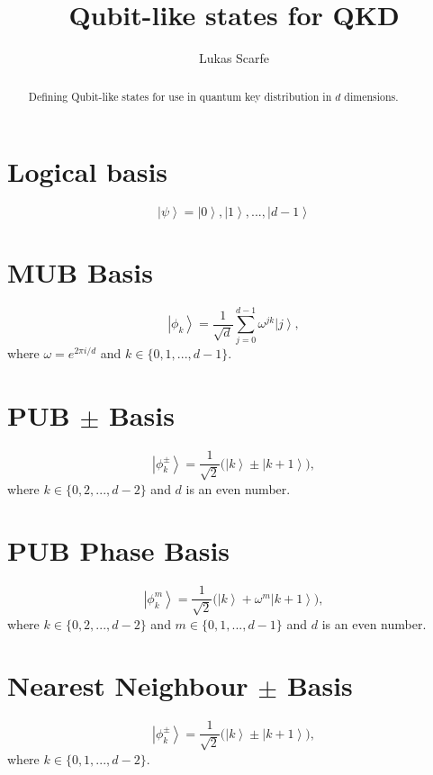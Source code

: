 \documentclass[]{article}
\title{Qubit-like states for QKD}
\author{Lukas Scarfe}
\newcommand{\ket}[1]{\left| #1 \right\rangle}
\begin{document}
\maketitle

\begin{abstract}
Defining Qubit-like states for use in quantum key distribution in $d$ dimensions.
\end{abstract}

\section{Logical basis}
\begin{equation}
\ket{\psi} = \ket{0}, \ket{1}, ... , \ket{d-1}
\end{equation}

\section{MUB Basis}
\begin{equation}
\ket{\phi_k} = \frac{1}{\sqrt{d}}\sum_{j=0}^{d-1} \omega^{jk} \ket{j},
\end{equation}
where $\omega = e^{2\pi i/d}$ and $k\in\{0,1,...,d-1\}$.

\section{PUB $\pm$ Basis}
\begin{equation}
\ket{\phi_k^{\pm}} = \frac{1}{\sqrt{2}}\big( \ket{k} \pm \ket{k+1} \big),
\end{equation}
where $k\in\{0,2,...,d-2\}$ and $d$ is an even number.

\section{PUB Phase Basis}
\begin{equation}
\ket{\phi_k^{m}} = \frac{1}{\sqrt{2}}\big( \ket{k} + \omega^{m}\ket{k+1} \big),
\end{equation}
where $k\in\{0,2,...,d-2\}$ and $m \in \{0,1,...,d-1\}$ and $d$ is an even number.

\section{Nearest Neighbour $\pm$ Basis}
\begin{equation}
\ket{\phi_k^{\pm}} = \frac{1}{\sqrt{2}}\big( \ket{k} \pm \ket{k+1} \big),
\end{equation}
where $k\in\{0,1,...,d-2\}$.
\end{document}
